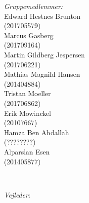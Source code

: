 \begin{titlepage}
\begin{minipage}{0.4\textwidth}
\begin{flushleft} \small
\emph{Gruppemedlemmer:} 
\\Edward Hestnes Brunton\\ (201705579)
\\Marcus Gasberg\\ (201709164) 
\\Martin Gildberg Jespersen\\ (201706221) 
\\Mathias Magnild Hansen\\ (201404884)
\\Tristan Moeller\\ (201706862)
\\Erik Mowinckel\\ (20107667)
\\Hamza Ben Abdallah\\ (????????)
\\Alparslan Esen\\ (201405877)
\end{flushleft}
\end{minipage}
~
\begin{minipage}{0.4\textwidth}
\begin{flushright} \small

\emph{Vejleder:} \\
\vejleder \\ %
\end{flushright}
\end{minipage}\\[1cm]



{\large \afleveringsdato}\\[1cm] %


\end{titlepage}
